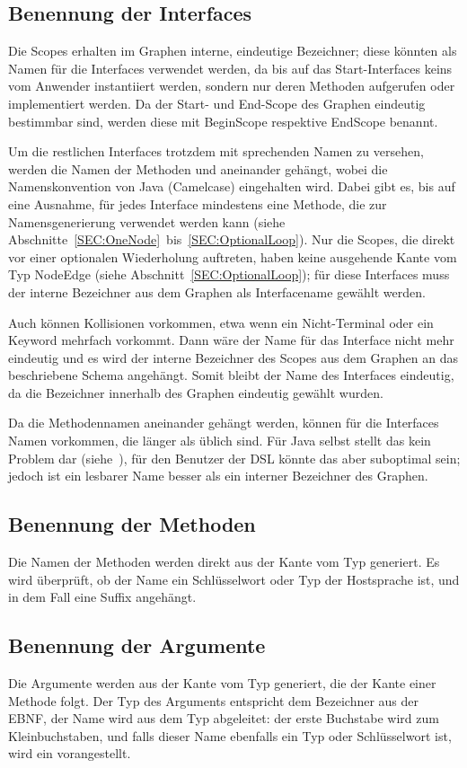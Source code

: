 \documentclass[../InterneDSLs.tex]{subfiles}
\begin{document}
\subsection{Benennung der Interfaces}
Die Scopes erhalten im Graphen interne, eindeutige Bezeichner; diese könnten als Namen für die Interfaces verwendet werden, da bis auf das Start-Interfaces keins vom Anwender instantiiert werden, sondern nur deren Methoden aufgerufen oder implementiert werden. Da der Start- und End-Scope des Graphen eindeutig bestimmbar sind, werden diese mit BeginScope respektive EndScope benannt.

Um die restlichen Interfaces trotzdem mit sprechenden Namen zu versehen, werden die Namen der Methoden und  aneinander gehängt, wobei die Namenskonvention von Java (Camelcase) eingehalten wird. Dabei gibt es, bis auf eine Ausnahme, für jedes Interface mindestens eine Methode, die zur Namensgenerierung verwendet werden kann (siehe Abschnitte~\ref{SEC:OneNode}~bis~\ref{SEC:OptionalLoop}). Nur die Scopes, die direkt vor einer optionalen Wiederholung auftreten, haben keine ausgehende Kante vom Typ NodeEdge (siehe Abschnitt~\ref{SEC:OptionalLoop}); für diese Interfaces muss der interne Bezeichner aus dem Graphen als Interfacename gewählt werden.

Auch können Kollisionen vorkommen, etwa wenn ein Nicht-Terminal oder ein Keyword mehrfach vorkommt. Dann wäre der Name für das Interface nicht mehr eindeutig und es wird der interne Bezeichner des Scopes aus dem Graphen an das beschriebene Schema angehängt. Somit bleibt der Name des Interfaces eindeutig, da die Bezeichner innerhalb des Graphen eindeutig gewählt wurden.

Da die Methodennamen aneinander gehängt werden, können für die Interfaces Namen vorkommen, die länger als üblich sind. Für Java selbst stellt das kein Problem dar (siehe~\cite[S. 24]{javalanguagespecification.oracle}), für den Benutzer der DSL könnte das aber suboptimal sein; jedoch ist ein lesbarer Name besser als ein interner Bezeichner des Graphen.

\subsection{Benennung der Methoden}
Die Namen der Methoden werden direkt aus der Kante vom Typ  generiert. Es wird überprüft, ob der Name ein Schlüsselwort oder Typ der Hostsprache ist, und in dem Fall eine Suffix angehängt.

\subsection{Benennung der Argumente}
Die Argumente werden aus der Kante vom Typ  generiert, die der Kante einer Methode folgt. Der Typ des Arguments entspricht dem Bezeichner aus der EBNF, der Name wird aus dem Typ abgeleitet: der erste Buchstabe wird zum Kleinbuchstaben, und falls dieser Name ebenfalls ein Typ oder Schlüsselwort ist, wird ein  vorangestellt.
\end{document}
